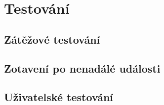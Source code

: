\chapter{Testování}

\section{Zátěžové testování}

\section{Zotavení po nenadálé události}

\section{Uživatelské testování}